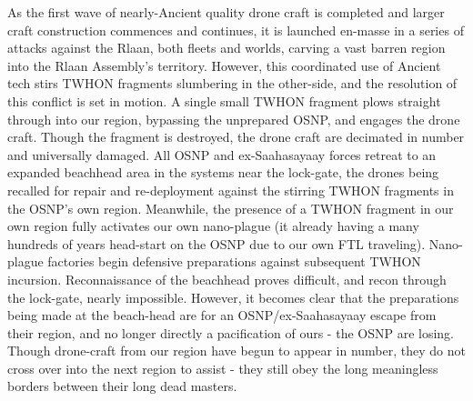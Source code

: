 As the first wave of nearly-Ancient quality drone craft is completed
and larger craft construction commences and continues, it is launched
en-masse in a series of attacks against the Rlaan, both fleets and
worlds, carving a vast barren region into the Rlaan Assembly's
territory. However, this coordinated use of Ancient tech stirs TWHON
fragments slumbering in the other-side, and the resolution of this
conflict is set in motion. A single small TWHON fragment plows
straight through into our region, bypassing the unprepared OSNP, and
engages the drone craft. Though the fragment is destroyed, the drone
craft are decimated in number and universally damaged. All OSNP and
ex-Saahasayaay forces retreat to an expanded beachhead area in the
systems near the lock-gate, the drones being recalled for repair and
re-deployment against the stirring TWHON fragments in the OSNP's own
region. Meanwhile, the presence of a TWHON fragment in our own region
fully activates our own nano-plague (it already having a many hundreds
of years head-start on the OSNP due to our own FTL
traveling). Nano-plague factories begin defensive preparations
against subsequent TWHON incursion. Reconnaissance of the beachhead
proves difficult, and recon through the lock-gate, nearly
impossible. However, it becomes clear that the preparations being made
at the beach-head are for an OSNP/ex-Saahasayaay escape from their
region, and no longer directly a pacification of ours - the OSNP are
losing. Though drone-craft from our region have begun to appear in
number, they do not cross over into the next region to assist - they
still obey the long meaningless borders between their long dead
masters.

